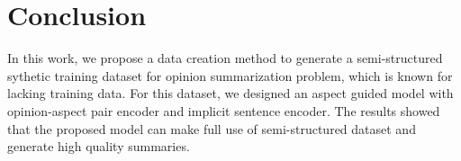 \section{Conclusion}
\label{sec:conclude}
In this work,
we propose a data creation method to generate
 a semi-structured sythetic training dataset for 
opinion summarization problem,
which is known for lacking training data.
For this dataset, 
we designed an aspect guided model with opinion-aspect pair encoder and implicit sentence encoder.
The results showed that
the proposed model can make full use of semi-structured dataset
and generate high quality summaries.



